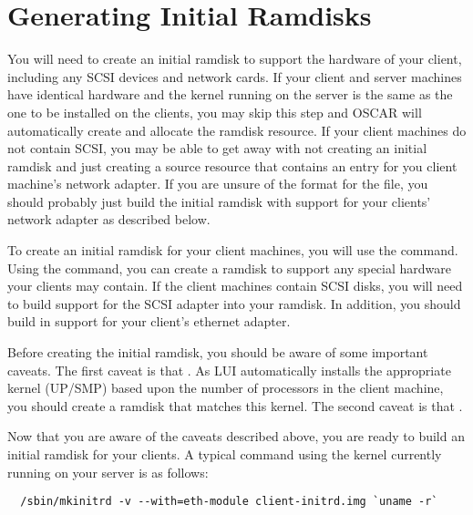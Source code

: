 %
%
%

\section{Generating Initial Ramdisks}
\label{app:ramdisk}

You will need to create an initial ramdisk to support the hardware of
your client, including any SCSI devices and network cards. If your
client and server machines have identical hardware and the kernel
running on the server is the same as the one to be installed on the
clients, you may skip this step and OSCAR will automatically create
and allocate the ramdisk resource. If your client machines do not
contain SCSI, you may be able to get away with not creating an initial
ramdisk and just creating a  source resource
that contains an entry for you client machine's network adapter. If
you are unsure of the format for the  file,
you should probably just build the initial ramdisk with support for
your clients' network adapter as described below.

To create an initial ramdisk for your client machines, you will use
the  command. Using the command, you can create a
ramdisk to support any special hardware your clients may contain. If
the client machines contain SCSI disks, you will need to build support
for the SCSI adapter into your ramdisk. In addition, you should build
in support for your client's ethernet adapter.

Before creating the initial ramdisk, you should be aware of some
important caveats. The first caveat is that . As LUI
automatically installs the appropriate kernel (UP/SMP) based upon the
number of processors in the client machine, you should create a
ramdisk that matches this kernel. The second caveat is that .

Now that you are aware of the caveats described above, you are ready
to build an initial ramdisk for your clients. A typical command using
the kernel currently running on your server is as follows:

\begin{verbatim}
  /sbin/mkinitrd -v --with=eth-module client-initrd.img `uname -r`
\end{verbatim}

